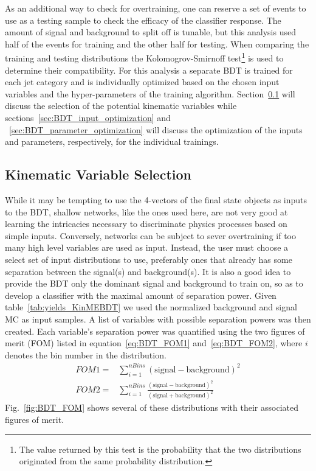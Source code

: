 As an additional way to check for overtraining, one can reserve a set of events to use as a testing sample to check the efficacy of the classifier response.
The amount of signal and background to split off is tunable, but this analysis used half of the events for training and the other half for testing.
When comparing the training and testing distributions the Kolomogrov-Smirnoff test\footnote{The value returned by this test is the probability that the two distributions originated from the same probability distribution.} is used to determine their compatibility.
For this analysis a separate BDT is trained for each jet category and is individually optimized based on the chosen input variables and the hyper-parameters of the training algorithm.
Section~\ref{sec:kin_var_sel} will discuss the selection of the potential kinematic variables while sections~\ref{sec:BDT_input_optimization} and ~\ref{sec:BDT_parameter_optimization} will discuss the optimization of the inputs and parameters, respectively, for the individual trainings.

\subsection{Kinematic Variable Selection}
\label{sec:kin_var_sel}

While it may be tempting to use the 4-vectors of the final state objects as inputs to the BDT, shallow networks, like the ones used here, are not very good at learning the intricacies necessary to discriminate physics processes based on simple inputs.
Conversely, networks can be subject to sever overtraining if too many high level variables are used as input.
Instead, the user must choose a select set of input distributions to use, preferably ones that already has some separation between the signal(s) and  background(s).
It is also a good idea to provide the BDT only the dominant signal and background to train on, so as to develop a classifier with the maximal amount of separation power.
Given table~\ref{tab:yields_KinMEBDT} we used the normalized \Wjets background and \HWW signal MC as input samples.
A list of variables with possible separation powers was then created.
Each variable's separation power was quantified using the two figures of merit (FOM) listed in equation~\ref{eq:BDT_FOM1} and~\ref{eq:BDT_FOM2}, where $i$ denotes the bin number in the distribution.
\begin{align}
  FOM1 = {}& \sum_{i=1}^{nBins}\left(\text{signal}-\text{background}\right)^{2}\label{eq:BDT_FOM1}\\
  FOM2 = {}& \sum_{i=1}^{nBins}\frac{\left(\text{signal}-\text{background}\right)^{2}}{\left(\text{signal}+\text{background}\right)^{2}}\label{eq:BDT_FOM2}
\end{align}
Fig.~\ref{fig:BDT_FOM} shows several of these distributions with their associated figures of merit.

